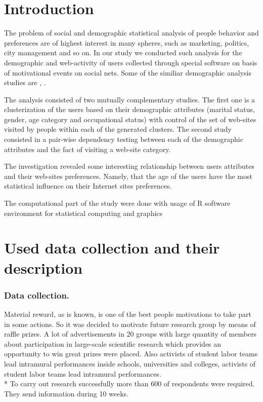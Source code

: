 \documentclass[runningheads,a4paper]{llncs}
\begin{document}
\section{Introduction}

The problem of social and demographic statistical analysis of people behavior and preferences are of highest interest in many spheres, such as marketing, politics, city management and so on. In our study we conducted such analysis for the demographic and web-activity of users collected through special software on basis of motivational events on social nets. Some of the similiar demographic analysis studies are \cite{sim-1}, \cite{sim-2}.

The analysis consisted of two mutually complementary studies. The first one is a clusterization of the users based on their demographic attributes (marital status, gender, age category and occupational status) with control of the set of web-sites visited by people within each of the generated clusters. The second study consisted in a pair-wise dependency testing between each of the demographic attributes and the fact of visiting a web-site category.

The investigation revealed some interesting relationship between users attributes and their web-sites preferences. Namely, that the age of the users have the most statistical influence on their Internet sites preferences. 

The computational part of the study were done with usage of R software environment for statistical computing and graphics \cite{r-project}


\section{Used data collection and their description}\label{the-description}


\subsubsection{Data collection.}
Material reward, as is known, is one of the best people motivations to take part in some actions. So it was decided to motivate future research group by means of raffle prizes.
A lot of advertisements in 20 groups with large quantity of members about participation in large-scale scientific research which provides an opportunity to win great prizes were placed. Also activists of student labor teams lead intramural performances inside schools, universities and colleges, activists of student labor teams lead intramural performances.
\\* To carry out research successfully more than 600 of respondents were required. They send information during 10 weeks.
\end{document}
